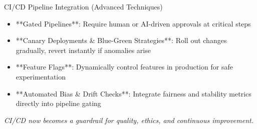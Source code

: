 \documentclass[aspectratio=169]{beamer}
\begin{document}
%
%
%
%
\begin{frame}{CI/CD Pipeline Integration (Advanced Techniques)}
\begin{itemize}
\item **Gated Pipelines**: Require human or AI-driven approvals at critical steps
\item **Canary Deployments \& Blue-Green Strategies**: Roll out changes gradually, revert instantly if anomalies arise
\item **Feature Flags**: Dynamically control features in production for safe experimentation
\item **Automated Bias \& Drift Checks**: Integrate fairness and stability metrics directly into pipeline gating
\end{itemize}

\emph{CI/CD now becomes a guardrail for quality, ethics, and continuous improvement.}
\end{frame}
\end{document}
